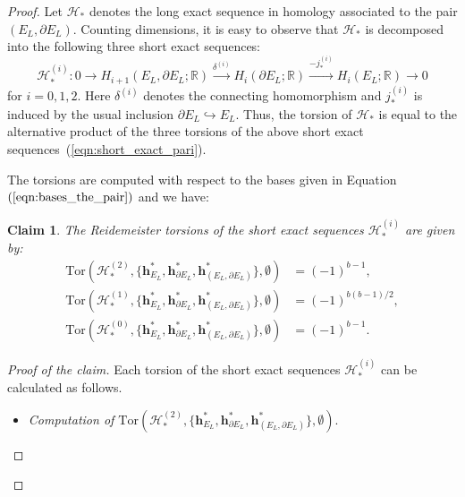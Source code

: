 \documentclass[a4paper]{amsart}
\theoremstyle{plain}
\newtheorem{claim}[theorem]{Claim}
\theoremstyle{definition}
\theoremstyle{remark}
\newcommand{\IR}{{\mathbb R}}
\newcommand{\Tor}[3]{\mathrm{Tor} ({#1}, {#2}, {#3})}
\newcommand{\hbasis}[2][h]{\mathbf{#1}^{#2}}
\newcommand{\hbasisrel}[1]{%
\hbasis{*}_{#1}, \hbasis{*}_{\bord #1}, \hbasis{*}_{(#1, \bord #1)}%
}
\newcommand{\bord}{\partial}
\begin{document}
\begin{proof}
  Let $\mathcal{H}_*$ denotes the long exact sequence in homology
  associated to the pair $(E_L, \bord E_L)$.  Counting dimensions, it is
  easy to observe that $\mathcal{H}_*$ is decomposed into the 
  following three short exact sequences:
  \begin{equation}\label{eqn:short_exact_pari}
    \mathcal{H}^{(i)}_* : 
        0 \to 
        H_{i+1}(E_L, \bord E_L;\IR) \xrightarrow{\delta^{(i)}} 
        H_i(\bord E_L;\IR) \xrightarrow{-j^{(i)}_*}
        H_i(E_L;\IR) \to
        0 
  \end{equation}
  for $i=0, 1, 2$. Here $\delta^{(i)}$ denotes the connecting
  homomorphism and $j^{(i)}_*$ is induced by the usual inclusion
  $\bord E_L \hookrightarrow E_L$.  Thus, the torsion of $\mathcal{H}_*$
  is equal to the alternative product of the three torsions of the
  above short exact sequences~(\ref{eqn:short_exact_pari}).

  The torsions are computed with respect to the bases given in
  Equation~$(\ref{eqn:bases_the_pair})$ and we have:

  \begin{claim}
    The Reidemeister torsions of the short exact sequences $\mathcal{H}^{(i)}_*$ are given by:
    \begin{align*}
    \Tor{\mathcal{H}^{(2)}_*}{\{\hbasisrel{E_L}\}}{\emptyset}
      &= (-1)^{b-1},\\
      \Tor{\mathcal{H}^{(1)}_*}{\{\hbasisrel{E_L}\}}{\emptyset}
      &= (-1)^{b(b-1)/2},\\
      \Tor{\mathcal{H}^{(0)}_*}{\{\hbasisrel{E_L}\}}{\emptyset} 
      &= (-1)^{b-1}.
    \end{align*}
  \end{claim}
  \begin{proof}[Proof of the claim]
    Each torsion of the short exact sequences $\mathcal{H}^{(i)}_*$
    can be calculated as follows.
    \begin{itemize}
    \item \emph{Computation of 
    $\Tor{\mathcal{H}^{(2)}_*}{\{\hbasisrel{E_L}\}}{\emptyset}$}.


\end{itemize}
\end{proof}
\end{proof}
\end{document}
